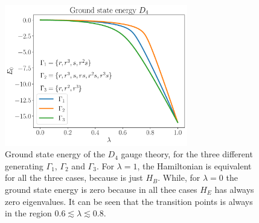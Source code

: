 \begin{figure}[h]
    \centering
    \includegraphics[width=8cm]{assets/graphs/gs_energy_comparison_1_2_3.pdf}
    \caption[Ground state energy for $D_4$]{Ground state energy of the $D_4$ gauge theory, for the three different generating $\Gamma_1$, $\Gamma_2$ and $\Gamma_3$.
        For $\lambda=1$, the Hamiltonian is equivalent for all the three cases, because is just $H_B$.
        While, for $\lambda=0$ the ground state energy is zero because in all thee cases $H_E$ has always zero eigenvalues.
        It can be seen that the transition points is always in the region $ 0.6 \lesssim \lambda \lesssim 0.8$.
    }%
    \label{fig:ground_state_energy_D4}
\end{figure}

\vspace*{0.5cm}

